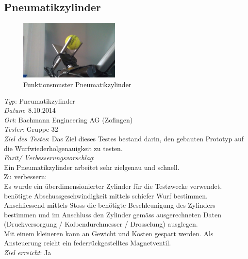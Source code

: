
\subsection{Pneumatikzylinder}
\begin{figure}[h!]
	\includegraphics[width=5cm]{Funktionstests/Bilder/PneumatikzylinderBild.jpg}
	\centering
	\caption{Funktionsmuster Pneumatikzylinder} 
\label{abb:PneumatikzylinderBild}
\end{figure}	
\textit{Typ}: Pneumatikzylinder \\ 
\textit{Datum}: 8.10.2014   \\
\textit{Ort}: Bachmann Engineering AG (Zofingen) \\
\textit{Tester}: Gruppe 32 \\
\textit{Ziel des Testes}:  Das Ziel dieses Testes bestand darin, den gebauten Prototyp auf die Wurfwiederholgenauigkeit zu testen. \\
\textit{Fazit/ Verbesserungsvorschlag}: \\
Ein Pneumatikzylinder arbeitet sehr zielgenau und schnell.\\
Zu verbessern:\\
Es wurde ein überdimensionierter Zylinder für die Testzwecke verwendet. \\
benötigte Abschussgeschwindigkeit mittels schiefer Wurf bestimmen. Anschliessend mittels Stoss die 
benötigte Beschleunigung des Zylinders bestimmen und im Anschluss den Zylinder gemäss
ausgerechneten Daten (Druckversorgung / Kolbendurchmesser / Drosselung) ausglegen.\\
Mit einem kleineren kann an Gewicht und Kosten gespart werden. Als Ansteuerung reicht ein federrückgestelltes Magnetventil. \\
\textit{Ziel erreicht}: Ja